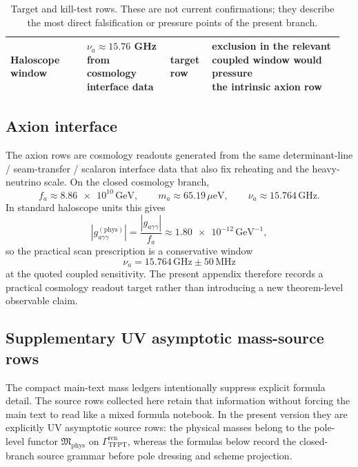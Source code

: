 \documentclass[11pt,a4paper]{article}
\theoremstyle{definition}
\theoremstyle{remark}
\newcommand{\GrenTFPT}{\Gamma_{\mathrm{TFPT}}^{\mathrm{ren}}}
\newcommand{\Mphys}{\mathfrak M_{\mathrm{phys}}}
\begin{document}
\begin{table}[H]
{\begin{tabular}{@{}>{\raggedright\arraybackslash}p{0.22\linewidth}>{\raggedright\arraybackslash}p{0.24\linewidth}>{\raggedright\arraybackslash}p{0.12\linewidth}>{\raggedright\arraybackslash}p{0.38\linewidth}@{}}
Haloscope window & \makecell[l]{$\nu_a\approx\num{15.76}$ GHz\\from cosmology interface data} & \makecell[l]{target\\row} & \makecell[l]{exclusion in the relevant\\coupled window would pressure\\the intrinsic axion row} \\
\bottomrule
\end{tabular}}
\caption{Target and kill-test rows. These are not current confirmations; they describe the most direct falsification or pressure points of the present branch.}
\label{tab:kill-tests}
\end{table}

\subsection{Axion interface}

The axion rows are cosmology readouts generated from the same determinant-line / seam-transfer /
scalaron interface data that also fix reheating and the heavy-neutrino scale. On the closed
cosmology branch,
\[
f_a\approx \num{8.86e10}\,\mathrm{GeV},
\qquad
m_a\approx \num{65.19}\,\mu\mathrm{eV},
\qquad
\nu_a\approx \num{15.764}\,\mathrm{GHz}.
\]
In standard haloscope units this gives
\[
\left|g_{a\gamma\gamma}^{(\mathrm{phys})}\right|
=
\frac{|g_{a\gamma\gamma}|}{f_a}
\approx
\num{1.80e-12}\,\mathrm{GeV}^{-1},
\]
so the practical scan prescription is a conservative window
\[
\nu_a=\num{15.764}\,\mathrm{GHz}\pm \num{50}\,\mathrm{MHz}
\]
at the quoted coupled sensitivity. The present appendix therefore records a practical cosmology
readout target rather than introducing a new theorem-level observable claim.

\subsection{Supplementary UV asymptotic mass-source rows}

The compact main-text mass ledgers intentionally suppress explicit formula detail. The source rows
collected here retain that information without forcing the main text to read like a mixed formula
notebook. In the present version they are explicitly UV asymptotic source rows: the physical masses
belong to the pole-level functor $\Mphys$ on $\GrenTFPT$, whereas the formulas below record the
closed-branch source grammar before pole dressing and scheme projection.
\end{document}
